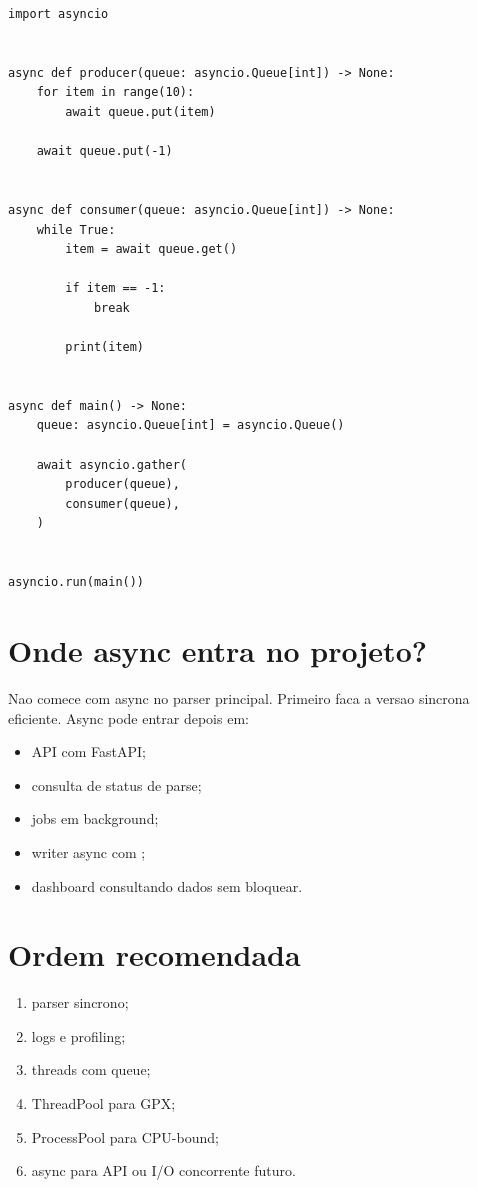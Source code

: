 \begin{lstlisting}[style=devbutterpython]
import asyncio


async def producer(queue: asyncio.Queue[int]) -> None:
    for item in range(10):
        await queue.put(item)

    await queue.put(-1)


async def consumer(queue: asyncio.Queue[int]) -> None:
    while True:
        item = await queue.get()

        if item == -1:
            break

        print(item)


async def main() -> None:
    queue: asyncio.Queue[int] = asyncio.Queue()

    await asyncio.gather(
        producer(queue),
        consumer(queue),
    )


asyncio.run(main())
\end{lstlisting}

\section{Onde async entra no projeto?}

Nao comece com async no parser principal. Primeiro faca a versao sincrona eficiente. Async pode entrar depois em:

\begin{itemize}
  \item API com FastAPI;
  \item consulta de status de parse;
  \item jobs em background;
  \item writer async com ;
  \item dashboard consultando dados sem bloquear.
\end{itemize}

\section{Ordem recomendada}

\begin{enumerate}
  \item parser sincrono;
  \item logs e profiling;
  \item threads com queue;
  \item ThreadPool para GPX;
  \item ProcessPool para CPU-bound;
  \item async para API ou I/O concorrente futuro.
\end{enumerate}
